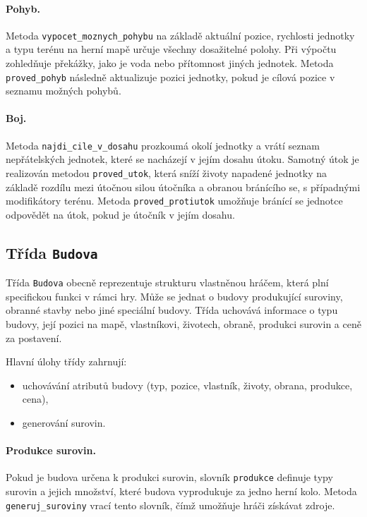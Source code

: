 \paragraph{Pohyb.}
Metoda \texttt{vypocet\_moznych\_pohybu} na základě aktuální pozice, rychlosti jednotky a typu terénu na herní mapě určuje všechny dosažitelné polohy. Při výpočtu zohledňuje překážky, jako je voda nebo přítomnost jiných jednotek. Metoda \texttt{proved\_pohyb} následně aktualizuje pozici jednotky, pokud je cílová pozice v seznamu možných pohybů.

\paragraph{Boj.}
Metoda \texttt{najdi\_cile\_v\_dosahu} prozkoumá okolí jednotky a vrátí seznam nepřátelských jednotek, které se nacházejí v jejím dosahu útoku. Samotný útok je realizován metodou \texttt{proved\_utok}, která sníží životy napadené jednotky na základě rozdílu mezi útočnou silou útočníka a obranou bránícího se, s případnými modifikátory terénu. Metoda \texttt{proved\_protiutok} umožňuje bránící se jednotce odpovědět na útok, pokud je útočník v jejím dosahu.

\subsection{Třída \texttt{Budova}}
Třída \texttt{Budova} obecně reprezentuje strukturu vlastněnou hráčem, která plní specifickou funkci v rámci hry. Může se jednat o budovy produkující suroviny, obranné stavby nebo jiné speciální budovy. Třída uchovává informace o typu budovy, její pozici na mapě, vlastníkovi, životech, obraně, produkci surovin a ceně za postavení.

Hlavní úlohy třídy zahrnují:
\begin{itemize}
    \item uchovávání atributů budovy (typ, pozice, vlastník, životy, obrana, produkce, cena),
    \item generování surovin.
\end{itemize}

\paragraph{Produkce surovin.}
Pokud je budova určena k produkci surovin, slovník \texttt{produkce} definuje typy surovin a jejich množství, které budova vyprodukuje za jedno herní kolo. Metoda \texttt{generuj\_suroviny} vrací tento slovník, čímž umožňuje hráči získávat zdroje.

